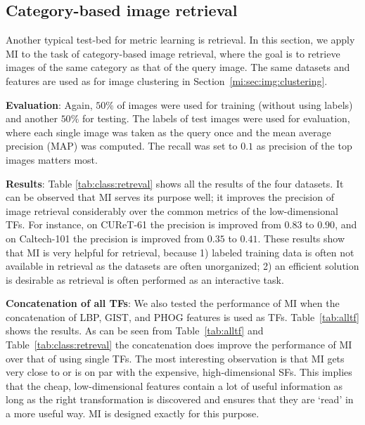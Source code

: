 
\subsection{Category-based image retrieval}

Another typical test-bed for metric learning is retrieval. In this
section, we apply MI to the task of category-based image retrieval,
where the goal is to retrieve images of the same category as that 
of the query image. The same datasets and features are used as for
image clustering in Section~\ref{mi:sec:img:clustering}.

\textbf{Evaluation}: Again, $50\%$ of images were used for training
(without using labels) and another $50\%$ for testing. The labels of
test images were used for evaluation, where each single image was
taken as the query once and the mean average precision (MAP) was
computed. The recall was set to $0.1$ as precision of the top images
matters most.


\textbf{Results}: Table \ref{tab:class:retreval} shows all the results
of the four datasets. It can be observed that MI
serves its purpose well; it improves the precision of image retrieval
considerably over the common metrics of the low-dimensional TFs. 
For instance, on CUReT-61 the precision is improved from
$0.83$ to $0.90$, and on Caltech-101 the precision is improved from
$0.35$ to $0.41$.  These results show that MI is very helpful for
retrieval, because 1) labeled training data is often not available in
retrieval as the datasets are often unorganized; 2) an efficient
solution is desirable as retrieval is often performed as an interactive
task.

\textbf{Concatenation of all TFs}: We also tested the performance of
MI when the concatenation of LBP, GIST, and PHOG features is used as 
TFs. Table~\ref{tab:alltf} shows the results. As can be seen from
Table~\ref{tab:alltf} and Table~\ref{tab:class:retreval} the 
concatenation does improve the performance of MI over that of using 
single TFs. The most interesting observation is that MI gets very close
to or is on par with the expensive, high-dimensional SFs. This implies
that the cheap, low-dimensional features contain a lot of useful
information as long as the right transformation is discovered and
ensures that they are `read' in a more useful way. MI is designed 
exactly for this purpose. 


